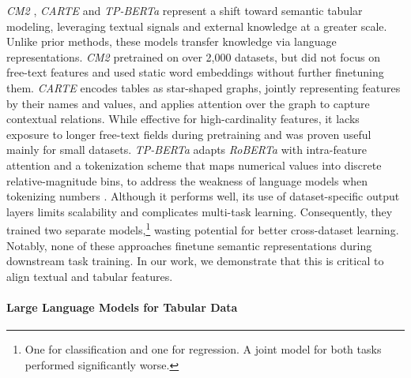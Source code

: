 \documentclass{article}
\begin{document}
\textit{CM2} \cite{zhou_unlocking_2023}, \textit{CARTE} \cite{kim_carte_2024} and \textit{TP-BERTa} \cite{yan_making_2023} represent a shift toward semantic tabular modeling, leveraging textual signals and external knowledge at a greater scale. Unlike prior methods, these models transfer knowledge via language representations. \textit{CM2} pretrained on over 2,000 datasets, but did not focus on free-text features and used static word embeddings without further finetuning them. \textit{CARTE} encodes tables as star-shaped graphs, jointly representing features by their names and values, and applies attention over the graph to capture contextual relations. While effective for high-cardinality features, it lacks exposure to longer free-text fields during pretraining and was proven useful mainly for small datasets. \textit{TP-BERTa} adapts \textit{RoBERTa} \cite{liu_roberta_2019} with intra-feature attention and a tokenization scheme that maps numerical values into discrete relative-magnitude bins, to address the weakness of language models when tokenizing numbers \cite{thawani_representing_2021}. Although it performs well, its use of dataset-specific output layers limits scalability and complicates multi-task learning. Consequently, they trained two separate models,\footnote{One for classification and one for regression. A joint model for both tasks performed significantly worse.} wasting potential for better cross-dataset learning.
Notably, none of these approaches finetune semantic representations during downstream task training. In our work, we demonstrate that this is critical to align textual and tabular features.

\paragraph{Large Language Models for Tabular Data}
\end{document}
